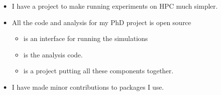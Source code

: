 {%
  \begin{itemize}
    \item I have a project  to make
      running experiments on HPC much simpler.
    \item All the code and analysis for my PhD project is open source
      \begin{itemize}
        \item {}
          is an interface for running the simulations
        \item {}
          is the analysis code.
        \item {} is
          a project putting all these components together.
      \end{itemize}
    \item I have made minor contributions to packages I use.
  \end{itemize}
}


\vspace{2em}


